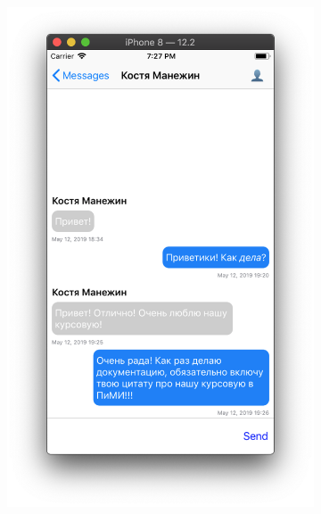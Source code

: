\documentclass[a4paper,12pt]{article}
\begin{document}
\begin{figure}[h!]
\begin{subfigure}[b]{0.3\linewidth}
			\includegraphics[width=\linewidth]{../includes/pmi/userChat.png}
		\end{subfigure}
		\begin{subfigure}[b]{0.3\linewidth}

\end{subfigure}
\end{figure}
\end{document}

